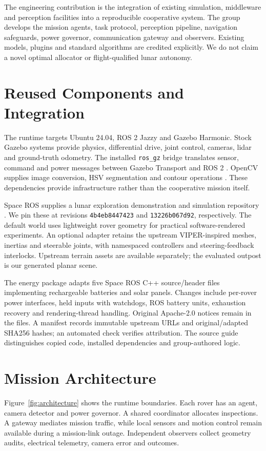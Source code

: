\documentclass[conference]{IEEEtran}
\begin{document}
The engineering contribution is the integration of existing simulation,
middleware and perception facilities into a reproducible cooperative system.
The group develops the mission agents, task protocol, perception pipeline,
navigation safeguards, power governor, communication gateway and observers.
Existing models, plugins and standard algorithms are credited explicitly.
We do not claim a novel optimal allocator or flight-qualified lunar autonomy.

\section{Reused Components and Integration}
The runtime targets Ubuntu 24.04, ROS 2 Jazzy and Gazebo Harmonic. Stock Gazebo
systems provide physics, differential drive, joint control, cameras, lidar and
ground-truth odometry. The installed \texttt{ros\_gz} bridge translates sensor,
command and power messages between Gazebo Transport and ROS 2 \cite{bridge}.
OpenCV supplies image conversion, HSV segmentation and contour operations
\cite{opencv}. These dependencies provide infrastructure rather than the
cooperative mission itself.

Space ROS supplies a lunar exploration demonstration and simulation repository
\cite{spacedemos,spacesim}. We pin these at revisions
\texttt{4b4eb8447423} and \texttt{13226b067d92}, respectively. The default world
uses lightweight rover geometry for practical software-rendered experiments.
An optional adapter retains the upstream VIPER-inspired meshes, inertias and
steerable joints, with namespaced controllers and steering-feedback interlocks.
Upstream terrain assets are available separately; the evaluated outpost is
our generated planar scene.

The energy package adapts five Space ROS C++ source/header files implementing
rechargeable batteries and solar panels. Changes include per-rover power
interfaces, held inputs with watchdogs, ROS battery units, exhaustion recovery
and rendering-thread handling. Original Apache-2.0 notices remain in the files.
A manifest records immutable upstream URLs and original/adapted SHA256 hashes;
an automated check verifies attribution. The source guide distinguishes copied
code, installed dependencies and group-authored logic.

\section{Mission Architecture}
Figure~\ref{fig:architecture} shows the runtime boundaries. Each rover has an
agent, camera detector and power governor. A shared coordinator allocates
inspections. A gateway mediates mission traffic, while local sensors and motion
control remain available during a mission-link outage. Independent observers
collect geometry audits, electrical telemetry, camera error and outcomes.
\end{document}
